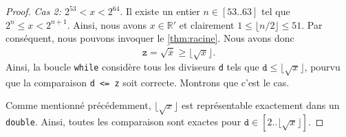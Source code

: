 \documentclass{article}
\newcommand{\R}{\mathbb{R}}
\begin{document}
\begin{proof}
  \bigskip\noindent\emph{Cas 2: $2^{53} < x < 2^{64}$}. Il existe un
  entier $n \in [53..63]$ tel que $2^n \leq x < 2^{n+1}$. Ainsi, nous
  avons $x \in \R'$ et clairement $1 \leq \lfloor n / 2 \rfloor \leq
  51$. Par conséquent, nous pouvons invoquer le
  \cref{thm:racine}. Nous avons donc
  \[
  \texttt{z} = \overline{\sqrt{\overline{x}}} \geq
  \lfloor\sqrt{x}\rfloor.
  \]
  Ainsi, la boucle \texttt{while} considère tous les
  diviseurs \texttt{d} tels que $\texttt{d} \leq
  \lfloor\sqrt{x}\rfloor$, pourvu que la comparaison \og
  \texttt{d <= z} \fg{} soit correcte. Montrons que c'est le
  cas.

  Comme mentionné précédemment, $\lfloor\sqrt{x}\rfloor$ est
  représentable exactement dans un \texttt{double}. Ainsi,
  toutes les comparaison sont exactes pour $\texttt{d} \in
  [2..\lfloor\sqrt{x}\rfloor]$.
\end{proof}
\end{document}
